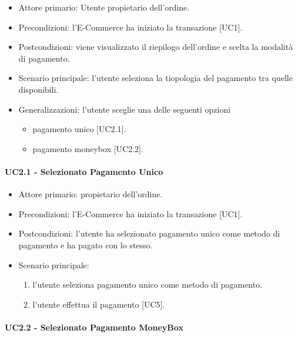 \begin{itemize}
    \item Attore primario: Utente propietario dell'ordine.
    \item Precondizioni: l'E-Commerce ha iniziato la transazione [UC1].
    \item Postcondizioni: viene visualizzato il riepilogo dell'ordine e scelta la modalità di pagamento.
    \item Scenario principale: l'utente seleziona la tiopologia del pagamento tra quelle disponibili.
    \item Generalizzazioni: l'utente sceglie una delle seguenti opzioni\begin{itemize}
        \item pagamento unico [UC2.1].
        \item pagamento moneybox [UC2.2].
    \end{itemize}
\end{itemize}

\paragraph{UC2.1 - Selezionato Pagamento Unico}

\begin{itemize}
    \item Attore primario: propietario dell'ordine.
    \item Precondizioni: l'E-Commerce ha iniziato la transazione [UC1].
    \item Postcondizioni: l'utente ha selezionato pagamento unico come metodo di pagamento e ha pagato con lo stesso.
    \item Scenario principale: \begin{enumerate}
        \item l'utente seleziona pagamento unico come metodo di pagamento.
        \item l'utente effettua il pagamento [UC5].
    \end{enumerate}
\end{itemize}

\paragraph{UC2.2 -  Selezionato Pagamento MoneyBox}

